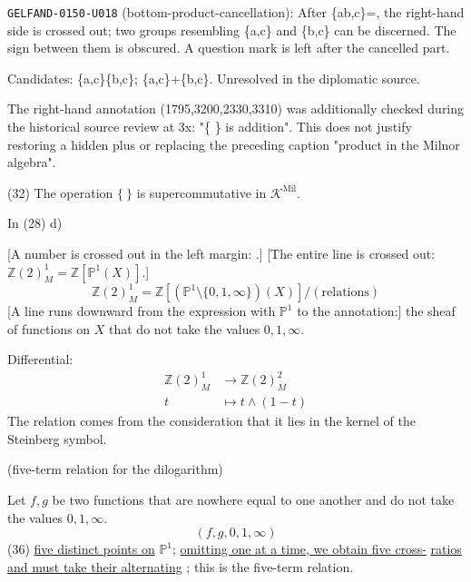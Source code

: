 \noindent\texttt{GELFAND-0150-U018} (bottom-product-cancellation): After \{ab,c\}=, the right-hand side is crossed out; two groups resembling \{a,c\} and \{b,c\} can be discerned. The sign between them is obscured. A question mark is left after the cancelled part.\par
Candidates: \{a,c\}\{b,c\}; \{a,c\}+\{b,c\}. Unresolved in the diplomatic source.\par
The right-hand annotation (1795,3200,2330,3310) was additionally checked during the historical source review at 3x: "\{ \} is addition". This does not justify restoring a hidden plus or replacing the preceding caption "product in the Milnor algebra".\par


(32) The operation $\{\ \}$ is supercommutative in $\mathcal K^{\mathrm{Mil}}$.

In (28) d)

[A number is crossed out in the left margin: .]
[The entire line is crossed out:
$\mathbb Z(2)_M^1=\mathbb Z[\mathbb P^1(X)]$.]
\begin{equation*}
\mathbb Z(2)_M^1=
\mathbb Z[(\mathbb P^1\setminus\{0,1,\infty\})(X)]/(\text{relations})
\tag{33}
\end{equation*}
[A line runs downward from the expression with $\mathbb P^1$ to the annotation:]
the sheaf of functions on $X$ that do not take the values $0,1,\infty$.

Differential:
\begin{equation*}
\begin{aligned}
\mathbb Z(2)_M^1&\longrightarrow\mathbb Z(2)_M^2\\
t&\longmapsto t\wedge(1-t)
\end{aligned}\tag{34}
\end{equation*}
The relation comes from the consideration that it lies in the kernel of the Steinberg symbol.

(five-term relation for the dilogarithm)

Let $f,g$ be two functions that are nowhere equal to one another and do not take the values $0,1,\infty$.
\begin{equation*}
(f,g,0,1,\infty)\tag{35}
\end{equation*}
(36) \underline{five distinct points on} $\mathbb P^1$;
\underline{omitting one at a time, we obtain five cross-}
\underline{ratios and must take their alternating}
;
this is the five-term relation.

